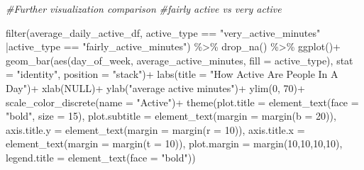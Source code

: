 \documentclass[
]{article}
\newenvironment{Shaded}{\begin{snugshade}}{\end{snugshade}}
\newcommand{\AttributeTok}[1]{\textcolor[rgb]{0.77,0.63,0.00}{#1}}
\newcommand{\CommentTok}[1]{\textcolor[rgb]{0.56,0.35,0.01}{\textit{#1}}}
\newcommand{\ConstantTok}[1]{\textcolor[rgb]{0.00,0.00,0.00}{#1}}
\newcommand{\DecValTok}[1]{\textcolor[rgb]{0.00,0.00,0.81}{#1}}
\newcommand{\FunctionTok}[1]{\textcolor[rgb]{0.00,0.00,0.00}{#1}}
\newcommand{\NormalTok}[1]{#1}
\newcommand{\SpecialCharTok}[1]{\textcolor[rgb]{0.00,0.00,0.00}{#1}}
\newcommand{\StringTok}[1]{\textcolor[rgb]{0.31,0.60,0.02}{#1}}
\begin{document}
\begin{Shaded}
\begin{Highlighting}[]
\CommentTok{\#Further visualization comparison}
\CommentTok{\#fairly active vs very active}

\FunctionTok{filter}\NormalTok{(average\_daily\_active\_df, active\_type }\SpecialCharTok{==} \StringTok{"very\_active\_minutes"} 
       \SpecialCharTok{|}\NormalTok{active\_type }\SpecialCharTok{==} \StringTok{"fairly\_active\_minutes"}\NormalTok{) }\SpecialCharTok{\%\textgreater{}\%} 
  \FunctionTok{drop\_na}\NormalTok{() }\SpecialCharTok{\%\textgreater{}\%} 
  \FunctionTok{ggplot}\NormalTok{()}\SpecialCharTok{+}
  \FunctionTok{geom\_bar}\NormalTok{(}\FunctionTok{aes}\NormalTok{(day\_of\_week, average\_active\_minutes, }\AttributeTok{fill =}\NormalTok{ active\_type), }
           \AttributeTok{stat =} \StringTok{"identity"}\NormalTok{, }\AttributeTok{position =} \StringTok{"stack"}\NormalTok{)}\SpecialCharTok{+}
  \FunctionTok{labs}\NormalTok{(}\AttributeTok{title =} \StringTok{"How Active Are People In A Day"}\NormalTok{)}\SpecialCharTok{+}
  \FunctionTok{xlab}\NormalTok{(}\ConstantTok{NULL}\NormalTok{)}\SpecialCharTok{+}
  \FunctionTok{ylab}\NormalTok{(}\StringTok{"average active minutes"}\NormalTok{)}\SpecialCharTok{+}
  \FunctionTok{ylim}\NormalTok{(}\DecValTok{0}\NormalTok{, }\DecValTok{70}\NormalTok{)}\SpecialCharTok{+}
  \FunctionTok{scale\_color\_discrete}\NormalTok{(}\AttributeTok{name =} \StringTok{"Active"}\NormalTok{)}\SpecialCharTok{+}
  \FunctionTok{theme}\NormalTok{(}\AttributeTok{plot.title =} \FunctionTok{element\_text}\NormalTok{(}\AttributeTok{face =} \StringTok{"bold"}\NormalTok{, }\AttributeTok{size =} \DecValTok{15}\NormalTok{),}
        \AttributeTok{plot.subtitle =} \FunctionTok{element\_text}\NormalTok{(}\AttributeTok{margin =} \FunctionTok{margin}\NormalTok{(}\AttributeTok{b =} \DecValTok{20}\NormalTok{)),}
        \AttributeTok{axis.title.y =} \FunctionTok{element\_text}\NormalTok{(}\AttributeTok{margin =} \FunctionTok{margin}\NormalTok{(}\AttributeTok{r =} \DecValTok{10}\NormalTok{)),}
        \AttributeTok{axis.title.x =} \FunctionTok{element\_text}\NormalTok{(}\AttributeTok{margin =} \FunctionTok{margin}\NormalTok{(}\AttributeTok{t =} \DecValTok{10}\NormalTok{)),}
        \AttributeTok{plot.margin =} \FunctionTok{margin}\NormalTok{(}\DecValTok{10}\NormalTok{,}\DecValTok{10}\NormalTok{,}\DecValTok{10}\NormalTok{,}\DecValTok{10}\NormalTok{),}
        \AttributeTok{legend.title =} \FunctionTok{element\_text}\NormalTok{(}\AttributeTok{face =} \StringTok{"bold"}\NormalTok{))}
\end{Highlighting}
\end{Shaded}
\end{document}
